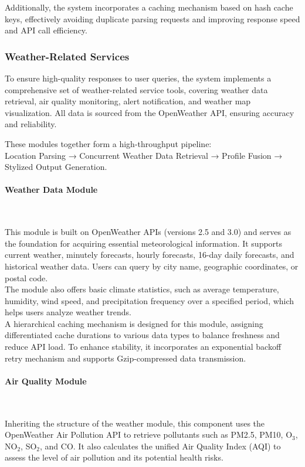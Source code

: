 \documentclass[final-report]{report-template}
\begin{document}
Additionally, the system incorporates a caching mechanism based on hash cache keys, effectively avoiding duplicate parsing requests and improving response speed and API call efficiency.  

\subsubsection{Weather-Related Services}

To ensure high-quality responses to user queries, the system implements a comprehensive set of weather-related service tools, covering weather data retrieval, air quality monitoring, alert notification, and weather map visualization. All data is sourced from the OpenWeather API, ensuring accuracy and reliability.

These modules together form a high-throughput pipeline: \\
Location Parsing → Concurrent Weather Data Retrieval → Profile Fusion → Stylized Output Generation.

\paragraph{Weather Data Module}~

This module is built on OpenWeather APIs (versions 2.5 and 3.0) and serves as the foundation for acquiring essential meteorological information. It supports current weather, minutely forecasts, hourly forecasts, 16-day daily forecasts, and historical weather data. Users can query by city name, geographic coordinates, or postal code. \\
The module also offers basic climate statistics, such as average temperature, humidity, wind speed, and precipitation frequency over a specified period, which helps users analyze weather trends. \\

A hierarchical caching mechanism is designed for this module, assigning differentiated cache durations to various data types to balance freshness and reduce API load. To enhance stability, it incorporates an exponential backoff retry mechanism and supports Gzip-compressed data transmission.

\paragraph{Air Quality Module}~

Inheriting the structure of the weather module, this component uses the OpenWeather Air Pollution API to retrieve pollutants such as PM2.5, PM10, O$_3$, NO$_2$, SO$_2$, and CO. It also calculates the unified Air Quality Index (AQI) to assess the level of air pollution and its potential health risks.
\end{document}
